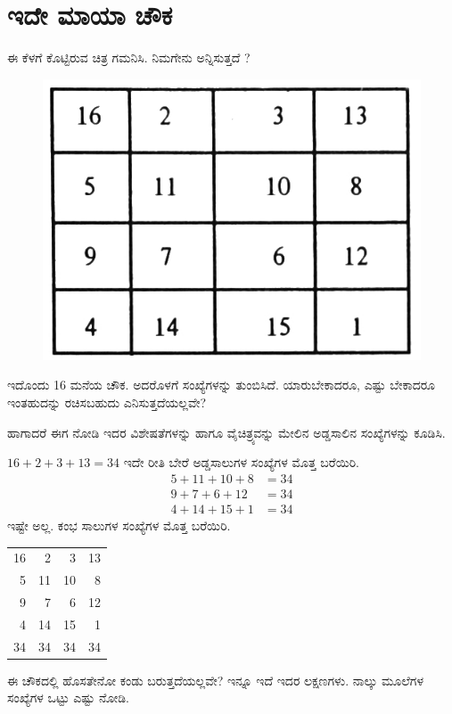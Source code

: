 \chapter{ಇದೇ ಮಾಯಾ ಚೌಕ}

ಈ ಕೆಳಗೆ ಕೊಟ್ಟಿರುವ ಚಿತ್ರ ಗಮನಿಸಿ. ನಿಮಗೇನು ಅನ್ನಿಸುತ್ತದೆ ?
\begin{figure}[H]
  \includegraphics{src/figures/chap1/fig1.1.jpg}
\end{figure}
ಇದೊಂದು 16 ಮನೆಯ ಚೌಕ. ಅದರೊಳಗೆ ಸಂಖ್ಯೆಗಳನ್ನು ತುಂಬಿಸಿದೆ. ಯಾರು\break ಬೇಕಾದರೂ, ಎಷ್ಟು ಬೇಕಾದರೂ ಇಂತಹುದನ್ನು ರಚಿಸಬಹುದು ಎನಿಸುತ್ತದೆಯಲ್ಲವೇ?

ಹಾಗಾದರೆ ಈಗ ನೋಡಿ ಇದರ ವಿಶೇಷತೆಗಳನ್ನು ಹಾಗೂ ವೈಚಿತ್ರ್ಯವನ್ನು ಮೇಲಿನ ಅಡ್ಡಸಾಲಿನ ಸಂಖ್ಯೆಗಳನ್ನು ಕೂಡಿಸಿ.

$16+2+3+13=34$
ಇದೇ ರೀತಿ ಬೇರೆ ಅಡ್ಡಸಾಲುಗಳ ಸಂಖ್ಯೆಗಳ ಮೊತ್ತ ಬರೆಯಿರಿ.
\begin{align*}
5+11+10+8 & = 34\\
9+7+6+12 & = 34\\
4+14+15+1 & = 34
\end{align*}
ಇಷ್ಟೇ ಅಲ್ಲ. ಕಂಭ ಸಾಲುಗಳ ಸಂಖ್ಯೆಗಳ ಮೊತ್ತ ಬರೆಯಿರಿ.
\begin{center}
\begin{tabular}{rrrr}
16 & 2 & 3 & 13 \\
5 & 11 & 10 & 8\\
9 & 7 & 6 & 12\\
4 & 14 & 15 & 1\\
34 & 34 & 34 & 34 
\end{tabular}
\end{center}
ಈ ಚೌಕದಲ್ಲಿ ಹೊಸತೇನೋ ಕಂಡು ಬರುತ್ತದೆಯಲ್ಲವೇ? ಇನ್ನೂ ಇದೆ ಇದರ ಲಕ್ಷಣಗಳು. ನಾಲ್ಕು ಮೂಲೆಗಳ ಸಂಖ್ಯೆಗಳ ಒಟ್ಟು ಎಷ್ಟು ನೋಡಿ.

